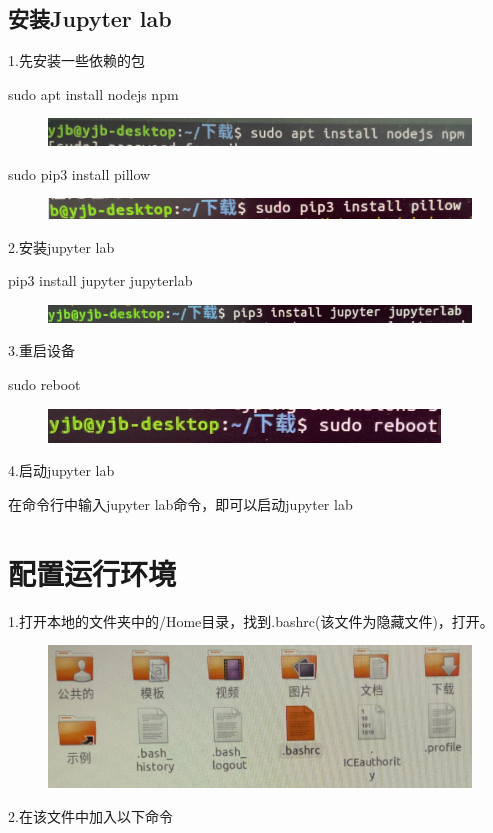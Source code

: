 \documentclass[openbib]{article}
\begin{document}

\subsection{安装Jupyter lab}
1.先安装一些依赖的包

sudo apt install nodejs npm
\begin{figure}[H]
	\centering
	\includegraphics[scale=0.3]{d13}
\end{figure}

sudo pip3 install pillow
\begin{figure}[H]
	\centering
	\includegraphics[scale=0.3]{d14}
\end{figure}
2.安装jupyter lab

pip3 install jupyter jupyterlab
\begin{figure}[H]
	\centering
	\includegraphics[scale=0.3]{d15}
\end{figure}
3.重启设备

sudo reboot
\begin{figure}[H]
	\centering
	\includegraphics[scale=0.3]{d16}
\end{figure}
4.启动jupyter lab

在命令行中输入jupyter lab命令，即可以启动jupyter lab

\section{配置运行环境}
1.打开本地的文件夹中的/Home目录，找到.bashrc(该文件为隐藏文件)，打开。

\begin{figure}[H]
	\centering
	\includegraphics[scale=0.3]{d17}
\end{figure}
2.在该文件中加入以下命令
\end{document}
